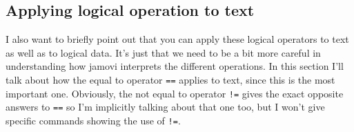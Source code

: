 \subsection{Applying logical operation to text~\label{sec:logictext}}

I also want to briefly point out that you can apply these logical operators to text as well as to logical data. It's just that we need to be a bit more careful in understanding how jamovi interprets the different operations. In this section I'll talk about how the equal to operator \texttt{==} applies to text, since this is the most important one. Obviously, the not equal to operator \texttt{!=} gives the exact opposite answers to \texttt{==} so I'm implicitly talking about that one too, but I won't give specific commands showing the use of \texttt{!=}. 

